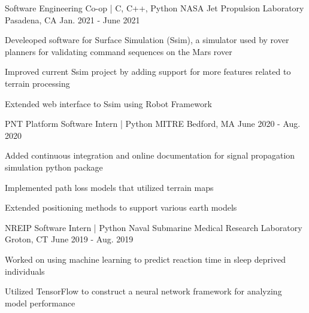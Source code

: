 
\begin{cventries}
  \cventry
    {Software Engineering Co-op | C, C++, Python} %
    {NASA Jet Propulsion Laboratory} %
    {Pasadena, CA} %
    {Jan. 2021 - June 2021} %
    {
      \begin{cvitems} %
        \item {Develeoped software for Surface Simulation (Ssim), a simulator used by rover planners for validating command sequences on the Mars rover}
        \item {Improved current Ssim project by adding support for more features related to terrain processing}
        \item {Extended web interface to Ssim using Robot Framework}
      \end{cvitems}
    }

  \cventry
    {PNT Platform Software Intern | Python} %
    {MITRE} %
    {Bedford, MA} %
    {June 2020 - Aug. 2020} %
    {
      \begin{cvitems} %
        \item {Added continuous integration and online documentation for signal propagation 
        simulation python package}
        \item {Implemented path loss models that utilized terrain maps}
        \item {Extended positioning methods to support various earth models}
      \end{cvitems}
    }

  \cventry
    {NREIP Software Intern | Python} %
    {Naval Submarine Medical Research Laboratory} %
    {Groton, CT} %
    {June 2019 - Aug. 2019} %
    {
      \begin{cvitems} %
        \item {Worked on using machine learning to predict reaction time in sleep deprived individuals}
        \item {Utilized TensorFlow to construct a neural network framework for analyzing model performance}
      \end{cvitems}
    }


\end{cventries}
